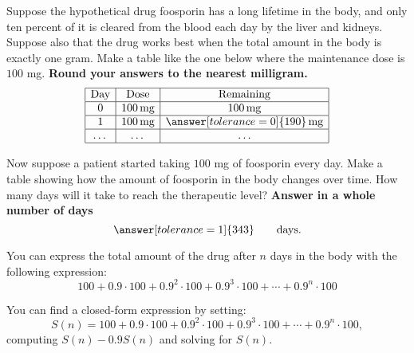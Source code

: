 \documentclass{ximera}
\begin{document}
\newpage
\begin{question}
  Suppose the hypothetical drug foosporin has a long lifetime in the
  body, and only ten percent of it is cleared from the blood each day
  by the liver and kidneys. Suppose also that the drug works best when
  the total amount in the body is exactly one gram. Make a table like the one
  below where the maintenance dose is $100$ mg. \textbf{Round your answers to the
  nearest milligram.}
  \[
  \begin{array}{|c|c|c|}
    \hline
    \text{Day} & \text{Dose} & \text{Remaining} \\ \hline
    0  & 100\,\text{mg} & 100\,\text{mg} \\ \hline
    1  & 100\,\text{mg} & \answer[tolerance=0]{190}\,\text{mg}\\ \hline
    \dots  & \dots & \dots \\ \hline
  \end{array}
  \]
\end{question}

 \begin{question}
 Now suppose a patient started taking $100$ mg of foosporin every day.
 Make a table showing how the amount of foosporin in the body changes
 over time.  How many days will it take to reach the therapeutic level?
 \textbf{Answer in a whole number of days}
 \[
 \answer[tolerance=1]{343}\qquad\text{days.}
 \]
 \begin{hint}
   You can express the total amount of the drug after $n$ days in the
   body with the following expression:
   \[
   100 + 0.9\cdot 100 + 0.9^2 \cdot 100 + 0.9^3 \cdot 100 +\cdots + 0.9^n \cdot 100
   \]
 \end{hint}
 \begin{hint}
   You can find a closed-form expression by setting:
   \[
   S(n)= 100 + 0.9\cdot 100 + 0.9^2 \cdot 100 + 0.9^3 \cdot 100 +\cdots + 0.9^n \cdot 100,
   \]
   computing $S(n) - 0.9 S(n)$ and solving for $S(n)$.
 \end{hint}
 \end{question}


\end{document}
